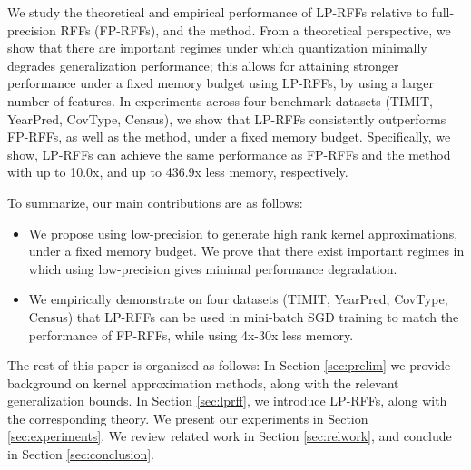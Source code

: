 We study the theoretical and empirical performance of LP-RFFs relative to full-precision RFFs (FP-RFFs), and the \Nystrom method.  From a theoretical perspective, we show that there are important regimes under which quantization minimally degrades generalization performance; this allows for attaining stronger performance under a fixed memory budget using LP-RFFs, by using a larger number of features. In experiments across four benchmark datasets (TIMIT, YearPred, CovType, Census), we show that LP-RFFs consistently outperforms FP-RFFs, as well as the \Nystrom method, under a fixed memory budget. Specifically, we show, LP-RFFs can achieve the same performance as FP-RFFs and the \Nystrom method with up to 10.0x, and up to 436.9x less memory, respectively.

To summarize, our main contributions are as follows:
\begin{itemize}
	\item We propose using low-precision to generate high rank kernel approximations, under a fixed memory budget. We prove that there exist important regimes in which using low-precision gives minimal performance degradation.
	\item We empirically demonstrate on four datasets (TIMIT, YearPred, CovType, Census) that LP-RFFs can be used in mini-batch SGD training to match the performance of FP-RFFs, while using 4x-30x less memory.
\end{itemize}

The rest of this paper is organized as follows:   In Section \ref{sec:prelim} we provide background on kernel approximation methods, along with the relevant generalization bounds. In Section \ref{sec:lprff}, we introduce LP-RFFs, along with the corresponding theory.  We present our experiments in Section \ref{sec:experiments}.  We review related work in Section \ref{sec:relwork}, and conclude in Section \ref{sec:conclusion}.